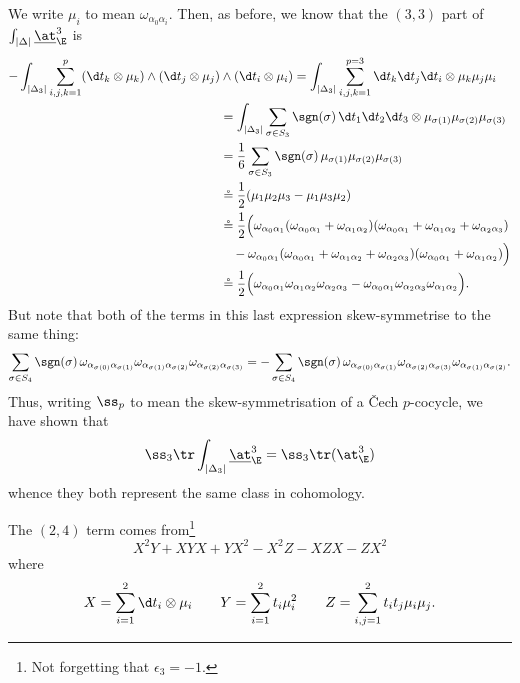         We write $\mu_i$ to mean $\omega_{\alpha_0\alpha_i}$.
        Then, as before, we know that the $(3,3)$ part of $\int_{|\Delta|}\underline{\at}_\E^3$ is
        \begin{align*}
            -\int_{|\Delta_3|}\sum_{i,j,k=1}^p (\d t_k\otimes\mu_k) \wedge (\d t_j\otimes\mu_j) &\wedge (\d t_i\otimes\mu_i) = \int_{|\Delta_3|}\sum_{i,j,k=1}^{p=3} \d t_k\d t_j\d t_i\otimes\mu_k\mu_j\mu_i\\
            &= \int_{|\Delta_3|}\sum_{\sigma\in S_3}\sgn(\sigma)\,\d t_1\d t_2\d t_3\otimes\mu_{\sigma(1)}\mu_{\sigma(2)}\mu_{\sigma(3)}\\
            &= \frac16 \sum_{\sigma\in S_3}\sgn(\sigma)\,\mu_{\sigma(1)}\mu_{\sigma(2)}\mu_{\sigma(3)}\\
            &\circeq \frac12(\mu_1\mu_2\mu_3 - \mu_1\mu_3\mu_2)\\
            &\circeq \frac12\Big(\omega_{\alpha_0\alpha_1}(\omega_{\alpha_0\alpha_1}+\omega_{\alpha_1\alpha_2})(\omega_{\alpha_0\alpha_1}+\omega_{\alpha_1\alpha_2}+\omega_{\alpha_2\alpha_3})\\
            &\quad -\omega_{\alpha_0\alpha_1}(\omega_{\alpha_0\alpha_1}+\omega_{\alpha_1\alpha_2}+\omega_{\alpha_2\alpha_3})(\omega_{\alpha_0\alpha_1}+\omega_{\alpha_1\alpha_2})\Big)\\
            &\circeq \frac12\Big(\omega_{\alpha_0\alpha_1}\omega_{\alpha_1\alpha_2}\omega_{\alpha_2\alpha_3} - \omega_{\alpha_0\alpha_1}\omega_{\alpha_2\alpha_3}\omega_{\alpha_1\alpha_2}\Big).
        \end{align*}
        But note that both of the terms in this last expression skew-symmetrise to the same thing:
        \[
            \sum_{\sigma\in S_4}\sgn(\sigma)\, \omega_{\alpha_{\sigma(0)}\alpha_{\sigma(1)}}\omega_{\alpha_{\sigma(1)}\alpha_{\sigma(2)}}\omega_{\alpha_{\sigma(2)}\alpha_{\sigma(3)}} = -\sum_{\sigma\in S_4}\sgn(\sigma)\, \omega_{\alpha_{\sigma(0)}\alpha_{\sigma(1)}}\omega_{\alpha_{\sigma(2)}\alpha_{\sigma(3)}}\omega_{\alpha_{\sigma(1)}\alpha_{\sigma(2)}}.
        \]
        Thus, writing $\ss_p$ to mean the skew-symmetrisation of a Čech $p$-cocycle, we have shown that
        \[
            \ss_3\tr\int_{|\Delta_3|}\underline{\at}_\E^3 = \ss_3\tr(\at_\E^3)
        \]
        whence they both represent the same class in cohomology.

        \bigskip

        The $(2,4)$ term comes from\footnote{Not forgetting that $\epsilon_3=-1$.}
        \begin{equation}\label{equation:2-4-term-in-x-and-y}
            X^2Y + XYX + YX^2 - X^2Z - XZX - ZX^2
        \end{equation}
        where
        \begin{equation*}
            X = \sum_{i=1}^2\d t_i\otimes\mu_i\qquad
            Y = \sum_{i=1}^2 t_i\mu_i^2\qquad
            Z = \sum_{i,j=1}^2 t_it_j\mu_i\mu_j.
        \end{equation*}

